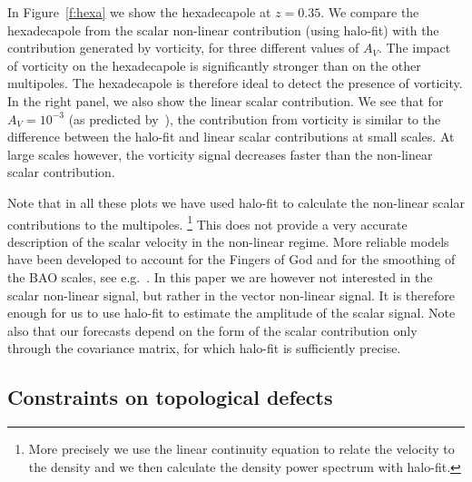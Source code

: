 \documentclass[a4paper,twocolumn,aps,prd,nolongbibliography,superscriptaddress,showpacs,showkeys,amsmath,amssymb,floatfix,nofootinbib]{revtex4-1}
\renewcommand{\[}{\begin{equation}}
\renewcommand{\]}{\end{equation}}
\begin{document}
In Figure~\ref{f:hexa} we show the hexadecapole at $z=0.35$. We compare the hexadecapole from the scalar non-linear contribution (using halo-fit) with the contribution generated by vorticity, for three different values of $A_V$. The impact of vorticity on the hexadecapole is significantly stronger than on the other multipoles. The hexadecapole is therefore ideal to detect the presence of vorticity. In the right panel, we also show the linear scalar contribution. We see that for $A_V=10^{-3}$ (as predicted by~\cite{Zhu:2017vtj}), the contribution from vorticity is similar to the difference between the halo-fit and linear scalar contributions at small scales. At large scales however, the vorticity signal decreases faster than the non-linear scalar contribution. 

Note that in all these plots we have used halo-fit to calculate the non-linear scalar contributions to the multipoles.%
\footnote{More precisely we use the linear continuity equation to relate the velocity to the density and we then calculate the density power spectrum with halo-fit.} %
This does not provide a very accurate description of the scalar velocity in the non-linear regime. More reliable models have been developed to account for the Fingers of God and for the smoothing of the BAO scales, see e.g.~\cite{2013MNRAS.431.2834X}. In this paper we are however not interested in the scalar non-linear signal, but rather in the vector non-linear signal. It is therefore enough for us to use halo-fit to estimate the amplitude of the scalar signal. Note also that our forecasts depend on the form of the scalar contribution only through the covariance matrix, for which halo-fit is sufficiently precise. 

\subsection{Constraints on topological defects}
\end{document}
